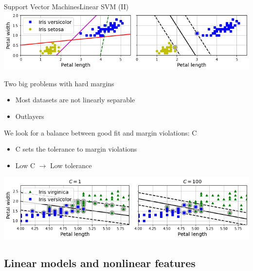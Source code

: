 \documentclass[10pt,compress]{beamer} %
\begin{document}
\begin{frame}{Support Vector Machines}{Linear SVM (II)}
    \centering \includegraphics[width=0.8\linewidth]{figs/svm-linear.png}\\
    \flushleft

    Two big problems with hard margins
    \begin{itemize}
        \item Most datasets are not linearly separable
        \item Outlayers
    \end{itemize}

    We look for a balance between good fit and margin violations: C
    \begin{itemize}
        \item C sets the tolerance to margin violations
        \item Low C $\rightarrow$ Low tolerance
    \end{itemize}

    \centering \includegraphics[width=0.8\linewidth]{figs/svm-c.png}
\end{frame}

\subsection{Linear models and nonlinear features}
\end{document}
